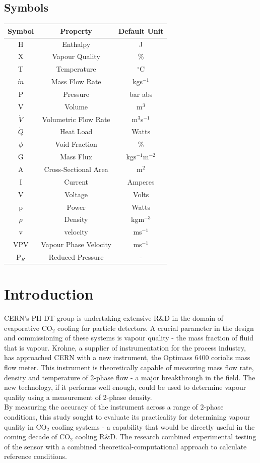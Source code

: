 \documentclass{report}
\begin{document}
\section*{Symbols}
\begin{center}
\begin{tabular}{|c|c|c|}
\hline
\textbf{Symbol} & \textbf{Property} & \textbf{Default Unit} \\\hline
H & Enthalpy & J \\\hline
X & Vapour Quality & \% \\\hline
T & Temperature & $^\circ$C\\\hline
$\dot{m}$ & Mass Flow Rate & kgs$^{-1}$ \\\hline
P & Pressure & bar abs \\\hline
V & Volume & m$^3$ \\\hline
$\dot{V}$ & Volumetric Flow Rate & m$^3$s$^{-1}$\\\hline
$\dot{Q}$ & Heat Load & Watts \\\hline
$\phi$ & Void Fraction & \% \\\hline
G & Mass Flux & kgs$^{-1}$m$^{-2}$\\\hline
A & Cross-Sectional Area & m$^2$\\\hline
I & Current & Amperes \\\hline
V & Voltage & Volts \\\hline
p & Power & Watts \\\hline
$\rho$ & Density & kgm$^{-3}$\\\hline
v & velocity &  ms$^{-1}$\\\hline
VPV & Vapour Phase Velocity & ms$^{-1}$\\\hline
P$_R$ &Reduced Pressure & -\\\hline
\end{tabular}
\end{center}
\tableofcontents
\chapter{Introduction}
CERN's PH-DT group is undertaking extensive R\&\ignorespaces D in the domain of evaporative CO$_2$ cooling for particle detectors. A crucial parameter in the design and commissioning of these systems is vapour quality - the mass fraction of fluid that is vapour. Krohne, a supplier of instrumentation for the process industry, has approached CERN with a new instrument, the Optimass 6400 coriolis mass flow meter. This instrument is theoretically capable of measuring mass flow rate, density and temperature of 2-phase flow - a major breakthrough  in the field. The new technology, if it performs well enough, could be used to determine vapour quality using a measurement of 2-phase density. \\
By measuring the accuracy of the instrument across a range of 2-phase conditions, this study sought to evaluate its practicality for determining vapour quality in CO$_2$ cooling systems - a capability that would be directly useful in the coming decade of CO$_2$ cooling R\&\ignorespaces D. The research combined experimental testing of the sensor with a combined theoretical-computational approach to calculate reference conditions.
\FloatBarrier
\end{document}
